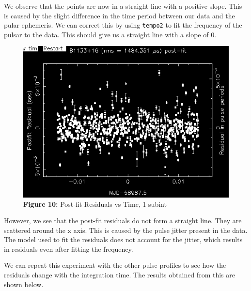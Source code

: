 \documentclass{article_saj}
\begin{document}
We observe that the points are now in a straight line with a positive slope. This is caused by the slight difference in the time period between our data and the pular ephemeris. We can correct this by using \texttt{tempo2} to fit the frequency of the pulsar to the data. This should give us a straight line with a slope of 0.

\begin{figure}[H]
  \begin{center}
    \includegraphics[width=0.9\columnwidth]{Plots/tempo3_edit.png}
    \caption*{\textbf{Figure 10:} Post-fit Residuals vs Time, 1 subint}
  \end{center}
\end{figure}

However, we see that the post-fit residuals do not form a straight line. They are scattered around the x axis. This is caused by the pulse jitter present in the data. The model used to fit the residuals does not account for the jitter, which results in residuals even after fitting the frequency.

We can repeat this experiment with the other pulse profiles to see how the residuals change with the integration time. The results obtained from this are shown below.
\end{document}
